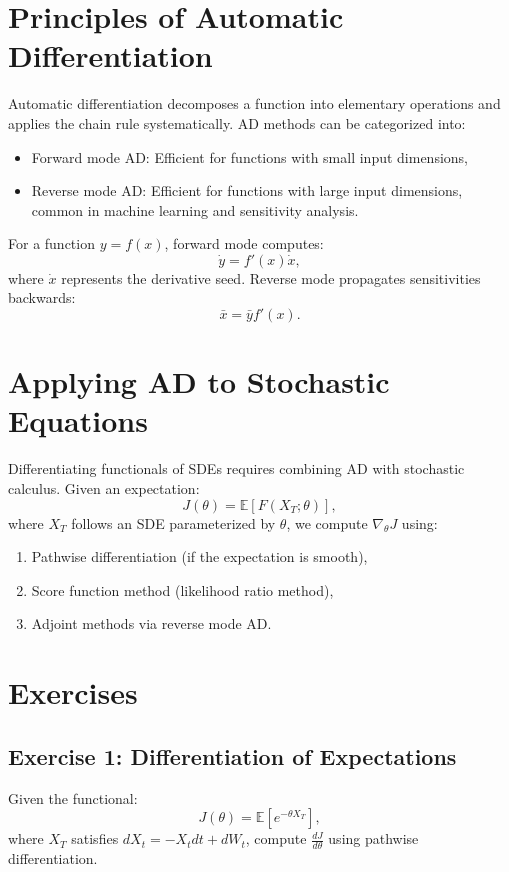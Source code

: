 \documentclass{article}
\begin{document}
	\section{Principles of Automatic Differentiation}
	Automatic differentiation decomposes a function into elementary operations and applies the chain rule systematically. AD methods can be categorized into:
	\begin{itemize}
		\item Forward mode AD: Efficient for functions with small input dimensions,
		\item Reverse mode AD: Efficient for functions with large input dimensions, common in machine learning and sensitivity analysis.
	\end{itemize}
	
	For a function $y = f(x)$, forward mode computes:
	\begin{equation}
		\dot{y} = f'(x) \dot{x},
	\end{equation}
	where $\dot{x}$ represents the derivative seed. Reverse mode propagates sensitivities backwards:
	\begin{equation}
		\bar{x} = \bar{y} f'(x).
	\end{equation}
	
	\section{Applying AD to Stochastic Equations}
	Differentiating functionals of SDEs requires combining AD with stochastic calculus. Given an expectation:
	\begin{equation}
		J(\theta) = \mathbb{E}[F(X_T; \theta)],
	\end{equation}
	where $X_T$ follows an SDE parameterized by $\theta$, we compute $\nabla_\theta J$ using:
	\begin{enumerate}
		\item Pathwise differentiation (if the expectation is smooth),
		\item Score function method (likelihood ratio method),
		\item Adjoint methods via reverse mode AD.
	\end{enumerate}
	
	\section{Exercises}
	\subsection{Exercise 1: Differentiation of Expectations}
	Given the functional:
	\begin{equation}
		J(\theta) = \mathbb{E}[e^{-\theta X_T}],
	\end{equation}
	where $X_T$ satisfies $dX_t = -X_t dt + dW_t$, compute $\frac{dJ}{d\theta}$ using pathwise differentiation.
	
\end{document}
